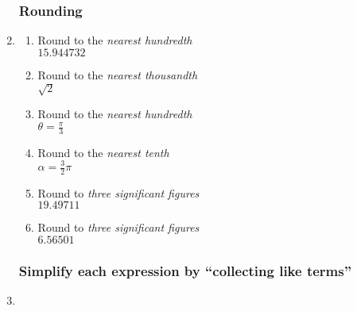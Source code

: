 \documentclass[12pt, twoside]{article}
\begin{document}
\begin{enumerate}
\subsubsection*{Rounding}
\item
  \begin{multicols}{2}
  \begin{enumerate}[itemsep=1cm]
    \item Round to the \emph{nearest hundredth} \\[0.25cm] 
    $15.944732$
    \item Round to the \emph{nearest thousandth} \\[0.25cm]
    $\sqrt{2}$
    \item Round to the \emph{nearest hundredth} \\[0.25cm]
    $\displaystyle \theta=\frac{\pi}{3}$
    \item Round to the \emph{nearest tenth} \\[0.25cm]
    $\alpha=\frac{3}{2} \pi$  
    \item Round to \emph{three significant figures} \\[0.25cm]
    $19.49711$
    \item Round to \emph{three significant figures} \\[0.25cm]
    $6.56501$

  \end{enumerate}
  \end{multicols}

\newpage
\subsubsection*{Simplify each expression by ``collecting like terms''}
\item 
\begin{enumerate}[itemsep=2cm]
    \end{enumerate} \vspace{0.5cm}
  

\end{enumerate}
\end{document}
